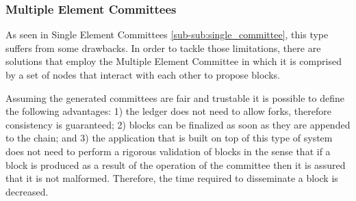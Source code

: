 

\subsubsection{Multiple Element Committees}
\label{sub-sub:multiple_committee}



As seen in Single Element Committees \ref{sub-sub:single_committee}, this type suffers from some drawbacks. In order to tackle those limitations, there are solutions that employ the Multiple Element Committee \cite{algorand_scaling_bft_cryptocurrencies, hyperledger_sawtooth} in which it is comprised by a set of nodes that interact with each other to propose blocks.

Assuming the generated committees are fair and trustable it is possible to define the following advantages: 1) the ledger does not need to allow forks, therefore consistency is guaranteed; 2) blocks can be finalized as soon as they are appended to the chain; and 3) the application that is built on top of this type of system does not need to perform a rigorous validation of blocks in the sense that if a block is produced as a result of the operation of the committee then it is assured that it is not malformed. Therefore, the time required to disseminate a block is decreased.

